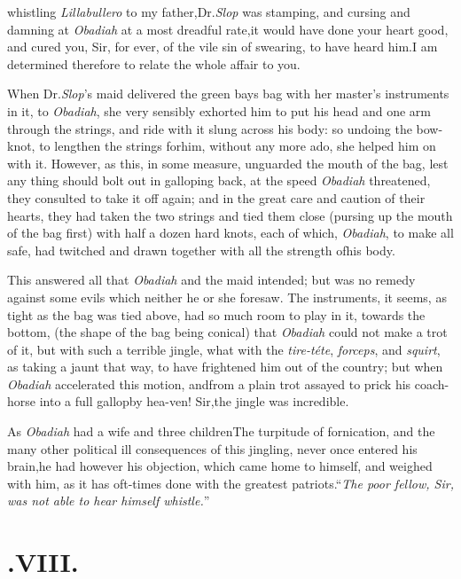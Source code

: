 \documentclass{article}
\begin{document}
 
whist\-ling \textit{Lillabullero} to my father,\tsk\break Dr.\@ \textit{Slop}
was stamping, and cursing and damning at \textit{Obadiah} at a most
dreadful rate,\tsh it would have done your heart good, and
cured you, Sir, for ever, of the vile sin of swearing, to have heard
him.\tsk I am determined therefore to relate the whole affair to
you.

When Dr.\@ \textit{Slop}’s maid delivered the green bays bag
with her master’s instruments in it, to \textit{Obadiah}, she
very sensibly exhorted him to put his head and one arm through
the strings, and ride with it slung across his body: so undoing
the
bow-knot, to lengthen the strings for\break him, without any
more ado, she helped him on with it. However, as this, in some
measure, unguarded the mouth of the bag, lest any thing should
bolt out in galloping back, at the speed \textit{Obadiah}
threatened, they consulted to take it off again; and in the
great care and caution of their hearts, they had taken the two
strings and tied them close (pursing up the mouth of the bag
first) with half a dozen hard knots, each of which,
\textit{Obadiah}, to make all safe, had twitched and drawn
together with all the strength of\break his body.

This answered all that \textit{Obadiah} and the maid intended;
but was no remedy against some evils which neither he or she
foresaw.  The instruments, it seems, as tight as the bag was
tied above, had 
so much room to play in it, towards the bottom, (the shape of
the bag being conical) that \textit{Obadiah} could not make a
trot of it, but with such a terrible jingle, what with the
\textit{tire-téte}, \textit{forceps}, and \textit{squirt}, as
 taking a jaunt
that way, to have frightened him out of the country; but when
\textit{Obadiah} accelerated this motion, and\break from a plain trot
assayed to prick his coach-horse into a full gallop\tsk by
hea-\break ven! Sir,\tsk the jingle was incredible.

As \textit{Obadiah} had a wife and three children\tsk The
turpitude of fornication, and the many other political ill
consequences of this jingling, never once entered his
brain,\tsk he had however his objection, which came home
to himself, and weigh\-ed with him, as it has oft-times done with
the greatest patriots.\tsk “\textit{The poor fel\-low, Sir, was
not able to hear himself whistle.}”

\section{.\quad  VIII.}
\end{document}
